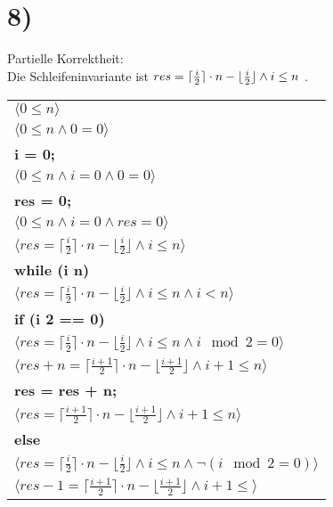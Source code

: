 \documentclass[12pt]{article}
\DeclarePairedDelimiter\floor{\lfloor}{\rfloor}
\begin{document}
\section{8)}
\begin{center}
    Partielle Korrektheit:\\
    Die Schleifeninvariante ist $ res = \lceil \frac{i}{2}\rceil \cdot n - \floor{\frac{i}{2}} \wedge i \leq n$ .
\bigbreak
\begin{tabular}{l}
    $\langle 0 \leq n \rangle$\\
    $\langle 0 \leq n \wedge 0 = 0 \rangle$\\
    \quad \textbf{i = 0;}\\
    $\langle 0 \leq n \wedge i = 0 \wedge 0 = 0\rangle$\\
    \quad \textbf{res = 0;}\\
    $\langle 0 \leq n \wedge i = 0 \wedge res = 0\rangle$\\
    $\langle res = \lceil \frac{i}{2}\rceil \cdot n - \lfloor\frac{i}{2} \rfloor \wedge i \leq n \rangle$\\
    \quad \textbf{while (i \pmb{$<$} n)} \pmb{\{} \\
    \quad \quad$\langle res = \lceil \frac{i}{2}\rceil \cdot n - \lfloor\frac{i}{2} \rfloor \wedge i \leq n \wedge i < n \rangle$\\
    \quad \quad \quad \textbf{if (i \pmb{$\%$} 2 == 0)} \pmb{\{} \\
    \quad \quad \quad \quad$\langle res = \lceil \frac{i}{2}\rceil \cdot n - \lfloor\frac{i}{2} \rfloor \wedge i \leq n \wedge i \mod 2 = 0 \rangle$\\
    \quad \quad \quad \quad$\langle res+n = \lceil \frac{i+1}{2}\rceil \cdot n - \lfloor\frac{i+1}{2} \rfloor \wedge i+1 \leq n \rangle$\\
    \quad \quad \quad \quad \quad \textbf{res = res + n;}\\
    \quad \quad \quad \quad$\langle res = \lceil \frac{i+1}{2}\rceil \cdot n - \lfloor\frac{i+1}{2} \rfloor \wedge i+1 \leq n \rangle$\\
    \quad \quad \quad \pmb{\}} \textbf{else} \pmb{\{} \\
    \quad \quad \quad \quad$\langle res = \lceil \frac{i}{2}\rceil \cdot n - \lfloor\frac{i}{2} \rfloor \wedge i \leq n \wedge \neg(i \mod 2 = 0) \rangle$\\
    \quad \quad \quad \quad$\langle res-1 = \lceil \frac{i+1}{2}\rceil \cdot n - \lfloor\frac{i+1}{2} \rfloor \wedge i+1 \leq \rangle$\\

\end{tabular}
\end{center}
\end{document}
